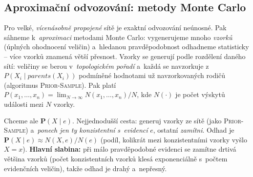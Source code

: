 \subsection{Aproximační odvozování: metody Monte Carlo}

Pro velké, \emph{vícenásobně propojené} sítě je exaktní odvozování neúnosné. Pak sáhneme k~\emph{aproximaci} metodami Monte Carlo: vygenerujeme mnoho \emph{vzorků} (úplných ohodnocení veličin) a~hledanou pravděpodobnost odhadneme statisticky -- více vzorků znamená větší přesnost. Vzorky se generují podle rozdělení daného sítí: veličiny se berou v~\emph{topologickém pořadí} a~každá se navzorkuje z~$P(X_i\mid \mathit{parents}(X_i))$ podmíněné hodnotami už navzorkovaných rodičů (algoritmus \textsc{Prior-Sample}). Pak platí $P(x_1,\dots,x_n)=\lim_{N\to\infty} N(x_1,\dots,x_n)/N$, kde $N(\cdot)$ je počet výskytů události mezi $N$ vzorky.

\begin{poznamka}
Chceme ale $\mathbf{P}(X\mid e)$. Nejjednodušší cesta: generuj vzorky ze sítě (jako \textsc{Prior-Sample}) a~\emph{ponech jen ty konzistentní s~evidencí} $e$, ostatní \emph{zamítni}. Odhad je $\mathbf{P}(X\mid e)\approx N(X,e)/N(e)$ (podíl, kolikrát mezi konzistentními vzorky vyšlo $X{=}x$). \textbf{Hlavní slabina:} při málo pravděpodobné evidenci se zamítne drtivá většina vzorků (počet konzistentních vzorků klesá exponenciálně s~počtem evidenčních veličin), takže odhad je drahý a~nepřesný.
\end{poznamka}

